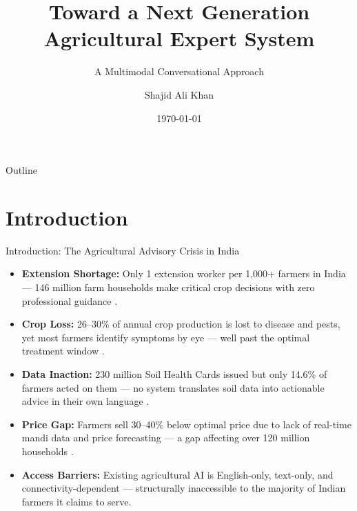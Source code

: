 \documentclass[aspectratio=169, 10pt]{beamer}
\title[Agricultural Expert System]{Toward a Next Generation \\ Agricultural Expert System}
\subtitle{A Multimodal Conversational Approach}
\author[Shajid Ali Khan]{Shajid Ali Khan}
\institute[IIIT Lucknow]{
    \textbf{Supervisor:} Dr. Deepak Kumar Singh \\
    \vspace{0.2cm}
    Department of Computer Science \\
    Indian Institute of Information Technology, Lucknow
}
\date{\today}
\begin{document}
\begin{frame}[plain]
    \titlepage
\end{frame}

\begin{frame}{Outline}
    \tableofcontents
\end{frame}

\section{Introduction}
\begin{frame}{Introduction: The Agricultural Advisory Crisis in India}
    \begin{itemize}
        \item \textbf{Extension Shortage:} Only 1 extension worker per 1,000+ farmers in India --- 146 million farm households make critical crop decisions with zero professional guidance \cite{icar2023}.
        \item \textbf{Crop Loss:} 26--30\% of annual crop production is lost to disease and pests, yet most farmers identify symptoms by eye --- well past the optimal treatment window \cite{fao2022}.
        \item \textbf{Data Inaction:} 230 million Soil Health Cards issued but only 14.6\% of farmers acted on them --- no system translates soil data into actionable advice in their own language \cite{nabard2023}.
        \item \textbf{Price Gap:} Farmers sell 30--40\% below optimal price due to lack of real-time mandi data and price forecasting --- a gap affecting over 120 million households \cite{enam2023}.
        \item \textbf{Access Barriers:} Existing agricultural AI is English-only, text-only, and connectivity-dependent --- structurally inaccessible to the majority of Indian farmers it claims to serve.
    \end{itemize}
\end{frame}

\end{document}
